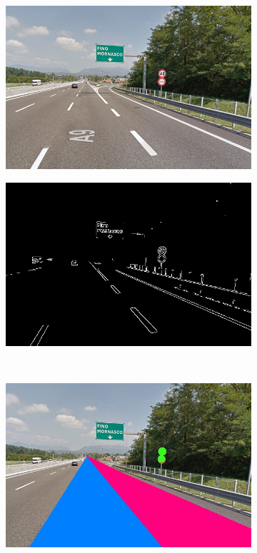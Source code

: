 \documentclass[twoside,onecolumn]{article}
\theoremstyle{definition}
\begin{document}
\begin{figure} \centering
\begin{subfigure}{0.45\textwidth}
  \includegraphics[width=\textwidth]{../images/road4.jpg}
\caption{ }\label{fig:r4fig}
\end{subfigure} \quad
\begin{subfigure}{0.45\textwidth}
\includegraphics[width=\textwidth]{../results/edgeMap_road4.jpg}
\caption{}\label{fig:road4edges}
\end{subfigure}\\
  \begin{subfigure}{0.6\textwidth}
\includegraphics[width=\textwidth]{../results/Circles_road4.jpg}
\caption{}\label{fig:road4circles}
\end{subfigure}\caption{}\label{fig:road4}
\end{figure}
\end{document}
